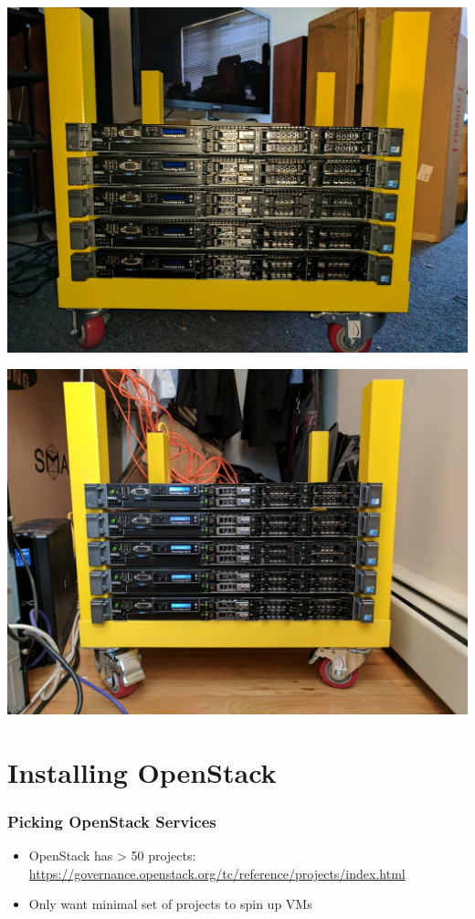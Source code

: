 \documentclass[aspectratio=169,11pt,hyperref={colorlinks=true}]{beamer}
\begin{document}
\begin{frame}
    \centering
    \includegraphics[width=.75\textwidth]{lack_rack.jpg}
\end{frame}

\begin{frame}
    \centering
    \includegraphics[width=.9\textwidth]{data_closet.jpg}
\end{frame}

\section{Installing OpenStack}
\begin{frame}
    \frametitle{Picking OpenStack Services}
    \begin{itemize}
        \item OpenStack has > 50 projects: \href{https://governance.openstack.org/tc/reference/projects/index.html}{https://governance.openstack.org/tc/reference/projects/index.html}
        \item Only want minimal set of projects to spin up VMs
    \end{itemize}
\end{frame}
\end{document}
